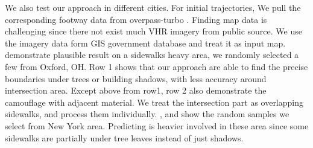 We also test our approach in different cities. For initial trajectories, We pull the corresponding footway data from overpass-turbo \cite{overpass_turbo}. Finding map data is challenging since there not exist much \ac{VHR} imagery from public source. We use the imagery data form GIS government database and treat it as input map.  demonstrate plausible result on a sidewalks heavy area, we randomly selected a few from Oxford, OH. Row 1 shows that our approach are able to find the precise boundaries under trees or building shadows, with less accuracy around intersection area. Except above from row1, row 2 also demonstrate the camouflage with adjacent material. We treat the intersection part as overlapping sidewalks, and process them individually. ,  and  show the random samples we select from New York area. Predicting is heavier involved in these area since some sidewalks are partially under tree leaves instead of just shadows. 



